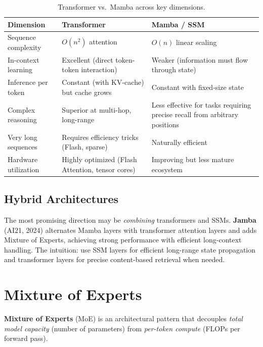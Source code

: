 \begin{table}[H]
\centering
\small
\begin{tabularx}{\textwidth}{@{}l X X@{}}
\toprule
\textbf{Dimension} & \textbf{Transformer} & \textbf{Mamba / SSM} \\
\midrule
Sequence complexity & $O(n^2)$ attention & $O(n)$ linear scaling \\
In-context learning & Excellent (direct token-token interaction)
  & Weaker (information must flow through state) \\
Inference per token & Constant (with KV-cache) but cache grows
  & Constant with fixed-size state \\
Complex reasoning & Superior at multi-hop, long-range & Less effective
  for tasks requiring precise recall from arbitrary positions \\
Very long sequences & Requires efficiency tricks (Flash, sparse)
  & Naturally efficient \\
Hardware utilization & Highly optimized (Flash Attention, tensor cores)
  & Improving but less mature ecosystem \\
\bottomrule
\end{tabularx}
\caption{Transformer vs.\ Mamba across key dimensions.}
\label{tab:transformer_vs_mamba}
\end{table}

\subsection{Hybrid Architectures}

The most promising direction may be \emph{combining} transformers and SSMs.
\textbf{Jamba} (AI21, 2024) alternates Mamba layers with transformer
attention layers and adds Mixture of Experts, achieving strong performance
with efficient long-context handling.  The intuition: use SSM layers for
efficient long-range state propagation and transformer layers for precise
content-based retrieval when needed.


\section{Mixture of Experts}
\label{sec:moe}

\textbf{Mixture of Experts} (MoE) is an architectural pattern that decouples
\emph{total model capacity} (number of parameters) from
\emph{per-token compute} (FLOPs per forward pass).

